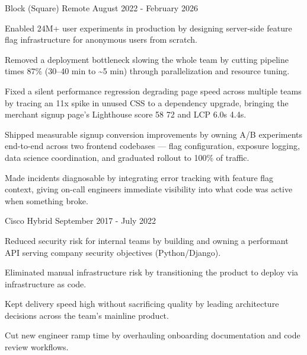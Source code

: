 \begin{cventries}
    {Block (Square)} %
    {Remote} %
    {August 2022 - February 2026} %
    {
      \begin{cvitems}
        \item {Enabled 24M+ user experiments in production by designing server-side feature flag infrastructure for anonymous users from scratch.}
        \item {Removed a deployment bottleneck slowing the whole team by cutting pipeline times 87\% (30--40 min to \textasciitilde5 min) through parallelization and resource tuning.}
        \item {Fixed a silent performance regression degrading page speed across multiple teams by tracing an 11x spike in unused CSS to a dependency upgrade, bringing the merchant signup page's Lighthouse score 58 \textrightarrow{} 72 and LCP 6.0s \textrightarrow{} 4.4s.}
        \item {Shipped measurable signup conversion improvements by owning A/B experiments end-to-end across two frontend codebases — flag configuration, exposure logging, data science coordination, and graduated rollout to 100\% of traffic.}
        \item {Made incidents diagnosable by integrating error tracking with feature flag context, giving on-call engineers immediate visibility into what code was active when something broke.}
      \end{cvitems}
    }

    {Cisco} %
    {Hybrid} %
    {September 2017 - July 2022} %
    {
      \begin{cvitems}
        \item {Reduced security risk for internal teams by building and owning a performant API serving company security objectives (Python/Django).}
        \item {Eliminated manual infrastructure risk by transitioning the product to deploy via infrastructure as code.}
        \item {Kept delivery speed high without sacrificing quality by leading architecture decisions across the team's mainline product.}
        \item {Cut new engineer ramp time by overhauling onboarding documentation and code review workflows.}
      \end{cvitems}
    }


\end{cventries}
